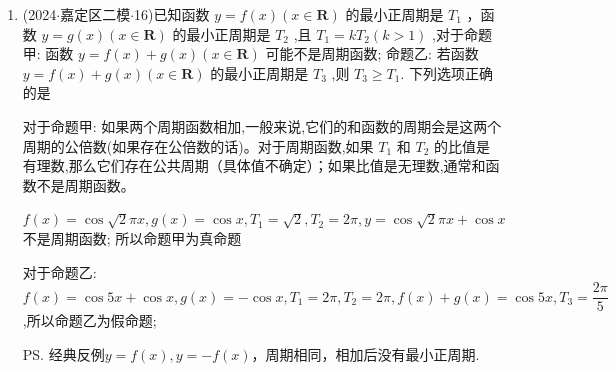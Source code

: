\begin{enumerate}
     \item (2024$\cdot$嘉定区二模$\cdot$16)已知函数 $y = f\left( x\right) \left( {x \in  \mathbf{R}}\right)$ 的最小正周期是 ${T}_{1}$ ，函数 $y = g\left( x\right) \left( {x \in  \mathbf{R}}\right)$ 的最小正周期是 ${T}_{2}$ ,且 ${T}_{1} = k{T}_{2}\left( {k > 1}\right)$ ,对于命题甲: 函数 $y = f\left( x\right)  + g\left( x\right) \left( {x \in  \mathbf{R}}\right)$ 可能不是周期函数; 命题乙: 若函数 $y = f\left( x\right)  + g\left( x\right) \left( {x \in  \mathbf{R}}\right)$ 的最小正周期是 ${T}_{3}$ ,则 ${T}_{3} \geq  {T}_{1}$. 下列选项正确的是 
    \begin{jieda}
        对于命题甲: 如果两个周期函数相加,一般来说,它们的和函数的周期会是这两个周期的公倍数(如果存在公倍数的话)。对于周期函数,如果 ${T}_{1}$ 和 ${T}_{2}$ 的比值是有理数,那么它们存在公共周期（具体值不确定）；如果比值是无理数,通常和函数不是周期函数。
        
        $f\left( x\right)  = \cos \sqrt{2}{\pi x},g\left( x\right)  = \cos x,{T}_{1} =  \sqrt{2},{T}_{2} = {2\pi },y = \cos \sqrt{2}{\pi x} + \cos x$ 不是周期函数; 所以命题甲为真命题
        
        对于命题乙: $f\left( x\right)  = \cos {5x} + \cos x,g\left( x\right)  =  - \cos x,{T}_{1} = {2\pi },{T}_{2} = {2\pi },f\left( x\right)  + g\left( x\right)  = \cos {5x},{T}_{3} = \dfrac{2\pi }{5}$ ,所以命题乙为假命题;

        \ps 经典反例$y = f(x), y = -f(x)$，周期相同，相加后没有最小正周期.
    \end{jieda}
\end{enumerate}